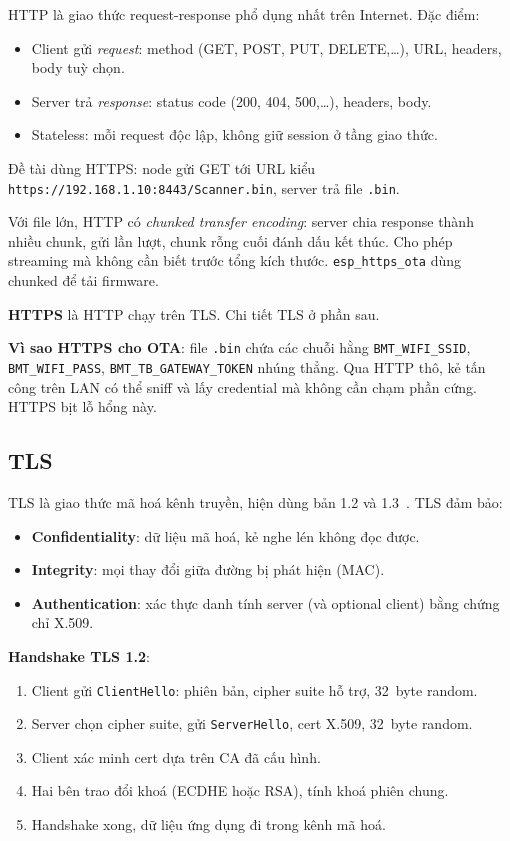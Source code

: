HTTP là giao thức request-response phổ dụng nhất trên Internet. Đặc điểm:

\begin{itemize}
    \item Client gửi \textit{request}: method (GET, POST, PUT, DELETE,\ldots), URL, headers, body tuỳ chọn.
    \item Server trả \textit{response}: status code (200, 404, 500,\ldots), headers, body.
    \item Stateless: mỗi request độc lập, không giữ session ở tầng giao thức.
\end{itemize}

Đề tài dùng HTTPS: node gửi GET tới URL kiểu \texttt{https://192.168.1.10:8443/Scanner.bin}, server trả file \texttt{.bin}.

Với file lớn, HTTP có \textit{chunked transfer encoding}: server chia response thành nhiều chunk, gửi lần lượt, chunk rỗng cuối đánh dấu kết thúc. Cho phép streaming mà không cần biết trước tổng kích thước. \texttt{esp\_https\_ota} dùng chunked để tải firmware.

\textbf{HTTPS} là HTTP chạy trên TLS. Chi tiết TLS ở phần sau.

\textbf{Vì sao HTTPS cho OTA}: file \texttt{.bin} chứa các chuỗi hằng \texttt{BMT\_WIFI\_SSID}, \texttt{BMT\_WIFI\_PASS}, \texttt{BMT\_TB\_GATEWAY\_TOKEN} nhúng thẳng. Qua HTTP thô, kẻ tấn công trên LAN có thể sniff và lấy credential mà không cần chạm phần cứng. HTTPS bịt lỗ hổng này.

\subsection{TLS}

TLS là giao thức mã hoá kênh truyền, hiện dùng bản 1.2 và 1.3~\cite{rfc8446}. TLS đảm bảo:

\begin{itemize}
    \item \textbf{Confidentiality}: dữ liệu mã hoá, kẻ nghe lén không đọc được.
    \item \textbf{Integrity}: mọi thay đổi giữa đường bị phát hiện (MAC).
    \item \textbf{Authentication}: xác thực danh tính server (và optional client) bằng chứng chỉ X.509.
\end{itemize}

\textbf{Handshake TLS 1.2}:

\begin{enumerate}
    \item Client gửi \texttt{ClientHello}: phiên bản, cipher suite hỗ trợ, 32~byte random.
    \item Server chọn cipher suite, gửi \texttt{ServerHello}, cert X.509, 32~byte random.
    \item Client xác minh cert dựa trên CA đã cấu hình.
    \item Hai bên trao đổi khoá (ECDHE hoặc RSA), tính khoá phiên chung.
    \item Handshake xong, dữ liệu ứng dụng đi trong kênh mã hoá.
\end{enumerate}

